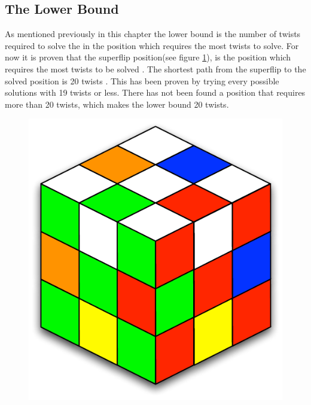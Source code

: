 \subsection{The Lower Bound}
As mentioned previously in this chapter the lower bound is the number of twists required to solve the \rubik{} in the position which requires the most twists to solve. 
For now it is proven that the superflip position(see figure \ref{fig:superflip}), is the position which requires the most twists to be solved \cite{speedsolving.wiki}.
The shortest path from the superflip to the solved position is 20 twists \cite{rokicki09}.
This has been proven by trying every possible solutions with 19 twists or less. 
There has not been found a position that requires more than 20 twists, which makes the lower bound 20 twists.

\begin{figure}[ht]
	\centering
		\includegraphics[scale = 0.7]{input/pics/superflip.pdf}
	\caption{}
	\label{fig:superflip}
\end{figure}



